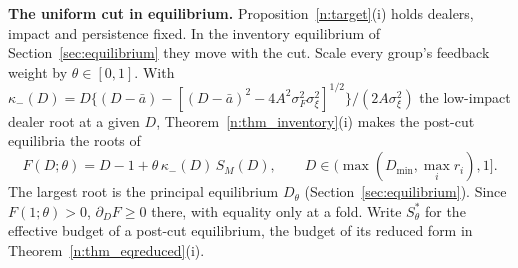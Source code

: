 \documentclass[11pt,letterpaper]{article}
\theoremstyle{definition}
\begin{document}
\textbf{The uniform cut in equilibrium.} Proposition~\ref{n:target}(i) holds dealers, impact and persistence fixed. In the inventory equilibrium of Section~\ref{sec:equilibrium} they move with the cut. Scale every group's feedback weight by $\theta \in [0, 1]$. With $\kappa_-(D) = D\{(D - \bar a) - [(D - \bar a)^2 - 4A^2\sigma_F^2\sigma_\xi^2]^{1/2}\}/(2A\sigma_\xi^2)$ the low-impact dealer root at a given $D$, Theorem~\ref{n:thm_inventory}(i) makes the post-cut equilibria the roots of
\begin{equation}\label{eq:Fcut}
  F(D; \theta) = D - 1 + \theta\, \kappa_-(D)\, S_M(D), \qquad D \in (\max(D_{\min}, \max_i r_i), 1].
\end{equation}
The largest root is the principal equilibrium $D_\theta$ (Section~\ref{sec:equilibrium}). Since $F(1; \theta) > 0$, $\partial_D F \ge 0$ there, with equality only at a fold. Write $S^*_\theta$ for the effective budget of a post-cut equilibrium, the budget of its reduced form in Theorem~\ref{n:thm_eqreduced}(i).
\end{document}
